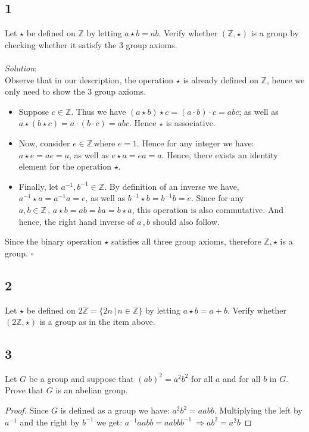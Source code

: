\documentclass[12pt,a4]{article}
\begin{document}
\subsection*{1} Let $\star$ be defined on $\mathbb{Z}$ by letting $a \star b = ab$. Verify whether $(\mathbb{Z}, \star)$ is a group by checking whether it satisfy the 3 group axioms. \\ \\
\textit{Solution}:\\
Observe that in our description, the operation $\star$ is already defined on $\mathbb{Z}$, hence we only need to show the 3 group axioms.

\begin{itemize}
\item Suppose $c \in \mathbb{Z}$. Thus we have $(a \star b) \star c = (a \cdot b) \cdot c = abc$; as well as $a \star (b \star c) = a \cdot (b \cdot c) = abc$. Hence $\star$ is associative.  
\item Now, consider \(e \in \mathbb{Z}\, \text{where } e=1\). Hence for any integer we have: \(a \star e = ae = a \), as well as \(e  \star a = ea = a\). Hence, there exists an identity element for the operation \(\star\). 
\item Finally, let \(a^{-1}, b^{-1} \in \mathbb{Z}\). By definition of an inverse we have, \(a^{-1} \star  a = a^{-1}a = e\), as well as \(b^{-1} \star  b = b^{-1}b = e\). Since for any \(a,b \in \mathbb{Z} \, , \, a\star b=ab=ba=b\star a \), this operation is also commutative. And hence, the right hand inverse of \(a \, , b\) should also follow. 
\end{itemize}

Since the binary operation \(\star \) satisfies all three group axioms, therefore \( \mathbb{Z}, \star \) is a group. \( \square   \) 

\subsection*{2} Let $\star$ be defined on $2\mathbb{Z} = \{ 2n\, | \,n \in \mathbb{Z} \}$ by letting $a \star b = a + b$. Verify whether $(2\mathbb{Z}, \star)$ is a group as in the item above. 







\subsection*{3} Let $G$ be a group and suppose that $(ab)^2=a^2b^2$ for all $a$ and for all $b$ in $G$. Prove that $G$ is an abelian group.
\begin{proof}
  Since \(G\) is defined as a group we have: \(a^{2}b^{2}=a a b b\). Multiplying the left by \(a^{-1}\) and the right by \(b^{-1}\) we get: 
  \(a^{-1} a a b b = a a b b b^{-1}\ \Rightarrow ab^{2} = a^2 b \)     
\end{proof}
\end{document}
